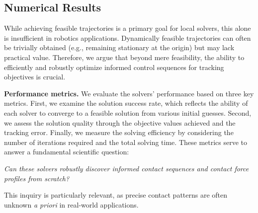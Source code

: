 \begin{enumerate}

\end{enumerate}

\subsection{Numerical Results }
While achieving feasible trajectories is a primary goal for local solvers, this alone is insufficient in robotics applications. Dynamically feasible trajectories can often be trivially obtained (e.g., remaining stationary at the origin) but may lack practical value. Therefore, we argue that beyond mere feasibility, the ability to efficiently and robustly optimize informed control sequences for tracking objectives is crucial.


\textbf{Performance metrics.} We evaluate the solvers' performance based on three key metrics. First, we examine the solution success rate, which reflects the ability of each solver to converge to a feasible solution from various initial guesses. Second, we assess the solution quality through the objective values achieved and the tracking error. Finally, we measure the solving efficiency by considering the number of iterations required and the total solving time. These metrics serve to answer a fundamental scientific question: 

\emph{Can these solvers robustly discover informed contact sequences and contact force profiles from scratch?} 

This inquiry is particularly relevant, as precise contact patterns are often unknown \emph{a priori} in real-world applications.

